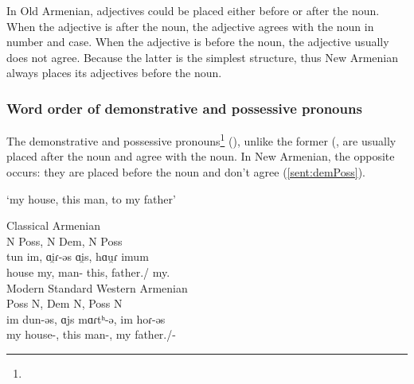 In Old Armenian, adjectives could be placed either before or after the noun. When the adjective is after the noun, the adjective agrees with the noun in number and case. When the adjective is before the noun, the adjective usually does not agree. Because the latter is the simplest structure, thus New Armenian always places its adjectives before the noun.




\subsubsection{Word order of demonstrative and possessive pronouns}

The demonstrative and possessive pronouns\footnote{} (), unlike the former (, are usually placed after the noun and agree with the noun. In New Armenian, the opposite occurs: they are placed before the noun and don't agree (\ref{sent:demPoss}). 


\begin{exe}
	
	\ex  `my house, this man, to my father'  	\label{sent:demPoss}  \begin{xlist}
		
		\ex Classical Armenian \\ \glll N Poss, N Dem, N Poss\\ 
		tun im, ɑi̯ɾ-əs ɑi̯s, hɑu̯ɾ imum \\
		house my, man-{\prox} this, father.{\dat}/{\gen} my.{\dat} \\
		\trans {}
		\ex Modern Standard Western Armenian \\ \glll Poss N, Dem N, Poss N \\
		im dun-əs, ɑjs mɑɾtʰ-ə, im hoɾ-əs \\ 
		my house-{\possFsg}, this man-{}, my father.{\dat}/{\gen}-{\possFsg} \\
		\trans  		{}
	\end{xlist}
\end{exe} 

